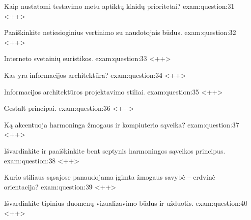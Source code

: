 

\begin{question}{%
  Kaip nustatomi testavimo metu aptiktų klaidų prioritetai?
  }{exam:question:31}
  <++>
\end{question}

\begin{question}{%
  Paaiškinkite netiesioginius vertinimo su naudotojais būdus.
  }{exam:question:32}
  <++>
\end{question}

\begin{question}{%
  Interneto svetainių euristikos.
  }{exam:question:33}
  <++>
\end{question}

\begin{question}{%
  Kas yra informacijos architektūra?
  }{exam:question:34}
  <++>
\end{question}

\begin{question}{%
  Informacijos architektūros projektavimo stiliai.
  }{exam:question:35}
  <++>
\end{question}

\begin{question}{%
  Gestalt principai.
  }{exam:question:36}
  <++>
\end{question}

\begin{question}{%
  Ką akcentuoja harmoninga žmogaus ir kompiuterio sąveika?
  }{exam:question:37}
  <++>
\end{question}

\begin{question}{%
  Išvardinkite ir paaiškinkite bent septynis harmoningos sąveikos
  principus.
  }{exam:question:38}
  <++>
\end{question}

\begin{question}{%
  Kurio stiliaus sąsajose panaudojama įgimta žmogaus savybė – erdvinė
  orientacija?
  }{exam:question:39}
  <++>
\end{question}

\begin{question}{%
  Išvardinkite tipinius duomenų vizualizavimo būdus ir užduotis.
  }{exam:question:40}
  <++>
\end{question}
